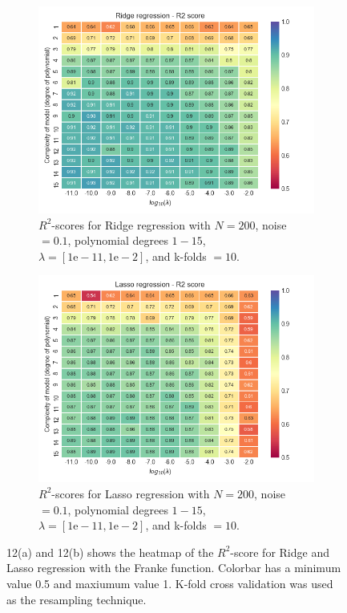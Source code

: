 \documentclass[a4paper,twocolumn]{article}
\begin{document}
\begin{figure}[ht]
    \centering
    \begin{subfigure}[b]{0.9\columnwidth}
        \includegraphics[width=\columnwidth]{lambda_vs_complexity_heatmap_Ridge_N=200_Noise=0.1_Degree=115.png}
        \caption{$R^{2}$-scores for Ridge regression with $N = 200$, noise $= 0.1$, polynomial degrees $1- 15$, $\lambda = [1\textrm{e}-11, 1\textrm{e}-2]$, and k-folds $= 10$.}
    \end{subfigure}
    
    \begin{subfigure}[b]{0.9\columnwidth}
        \includegraphics[width=\columnwidth]{lambda_vs_complexity_heatmap_Lasso_N=200_Noise=0.1_Degree=115.png}
        \caption{$R^{2}$-scores for Lasso regression with $N = 200$, noise $= 0.1$, polynomial degrees $1- 15$, $\lambda = [1\textrm{e}-11, 1\textrm{e}-2]$, and k-folds $= 10$.}
    \end{subfigure}
    \caption{12(a) and 12(b) shows the heatmap of the $R^{2}$-score for Ridge and Lasso regression with the Franke function. Colorbar has a minimum value 0.5 and maxiumum value 1. K-fold cross validation was used as the resampling technique.}
\end{figure}\\
\end{document}
